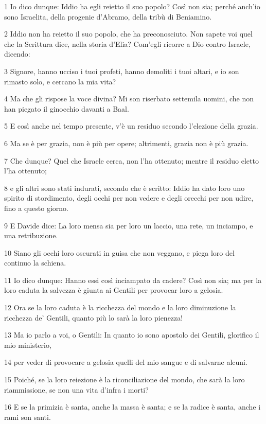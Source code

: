 \par 1 Io dico dunque: Iddio ha egli reietto il suo popolo? Così non sia; perché anch'io sono Israelita, della progenie d'Abramo, della tribù di Beniamino.
\par 2 Iddio non ha reietto il suo popolo, che ha preconosciuto. Non sapete voi quel che la Scrittura dice, nella storia d'Elia? Com'egli ricorre a Dio contro Israele, dicendo:
\par 3 Signore, hanno ucciso i tuoi profeti, hanno demoliti i tuoi altari, e io son rimasto solo, e cercano la mia vita?
\par 4 Ma che gli rispose la voce divina? Mi son riserbato settemila uomini, che non han piegato il ginocchio davanti a Baal.
\par 5 E così anche nel tempo presente, v'è un residuo secondo l'elezione della grazia.
\par 6 Ma se è per grazia, non è più per opere; altrimenti, grazia non è più grazia.
\par 7 Che dunque? Quel che Israele cerca, non l'ha ottenuto; mentre il residuo eletto l'ha ottenuto;
\par 8 e gli altri sono stati indurati, secondo che è scritto: Iddio ha dato loro uno spirito di stordimento, degli occhi per non vedere e degli orecchi per non udire, fino a questo giorno.
\par 9 E Davide dice: La loro mensa sia per loro un laccio, una rete, un inciampo, e una retribuzione.
\par 10 Siano gli occhi loro oscurati in guisa che non veggano, e piega loro del continuo la schiena.
\par 11 Io dico dunque: Hanno essi così inciampato da cadere? Così non sia; ma per la loro caduta la salvezza è giunta ai Gentili per provocar loro a gelosia.
\par 12 Ora se la loro caduta è la ricchezza del mondo e la loro diminuzione la ricchezza de' Gentili, quanto più lo sarà la loro pienezza!
\par 13 Ma io parlo a voi, o Gentili: In quanto io sono apostolo dei Gentili, glorifico il mio ministerio,
\par 14 per veder di provocare a gelosia quelli del mio sangue e di salvarne alcuni.
\par 15 Poiché, se la loro reiezione è la riconciliazione del mondo, che sarà la loro riammissione, se non una vita d'infra i morti?
\par 16 E se la primizia è santa, anche la massa è santa; e se la radice è santa, anche i rami son santi.
